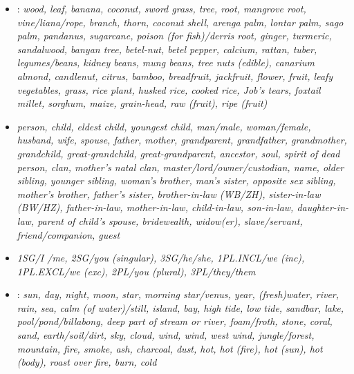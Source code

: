 \begin{itemize}
\item	{}: \it{wood},
\it{leaf},
\it{banana},
\it{coconut},
\it{sword grass},
\it{tree},
\it{root},
mangrove root,
\it{vine/liana/rope},
branch,
\it{thorn},
\it{coconut shell},
\it{arenga palm},
lontar palm,
\it{sago palm},
\it{pandanus},
\it{sugarcane},
poison (for fish)/derris root,
\it{ginger},
turmeric,
sandalwood,
banyan tree,
\it{betel-nut},
\it{betel pepper},
\it{calcium},
\it{rattan},
\it{tuber},
legumes/beans,
kidney beans,
mung beans,
tree nuts (edible),
canarium almond,
candlenut,
citrus,
\it{bamboo},
breadfruit,
jackfruit,
\it{flower},
\it{fruit},
leafy vegetables,
grass,
\it{rice plant},
\it{husked rice},
\it{cooked rice},
\it{Job’s tears},
\it{foxtail millet},
sorghum,
\it{maize},
\it{grain-head},
raw (fruit),
ripe (fruit)

\item	{}

\it{person},
\it{child},
\it{eldest child},
\it{youngest child},
\it{man/male},
\it{woman/female},
\it{husband},
\it{wife},
spouse,
\it{father},
\it{mother},
grandparent,
\it{grandfather},
\it{grandmother},
\it{grandchild},
great-grandchild,
great-grandparent,
ancestor,
\it{soul},
\it{spirit of dead person},
clan,
mother’s natal clan,
master/lord/owner/custodian,
\it{name},
\it{older sibling},
\it{younger sibling},
\it{woman’s brother},
\it{man’s sister},
opposite sex sibling,
\it{mother’s brother},
\it{father’s sister},
\it{brother-in-law (WB/ZH)},
\it{sister-in-law (BW/HZ)},
father-in-law,
mother-in-law,
child-in-law,
son-in-law,
daughter-in-law,
\it{parent of child’s spouse},
bridewealth,
widow(er),
\it{slave/servant},
\it{friend/companion},
\it{guest}

\item	{} 
\it{1SG/I /me},
\it{2SG/you (singular)},
\it{3SG/he/she},
\it{1PL.INCL/we (inc)},
\it{1PL.EXCL/we (exc)},
\it{2PL/you (plural)},
\it{3PL/they/them}
	
\item	{}:
\it{sun},
\it{day},
\it{night},
\it{moon},
\it{star},
morning star/venus,
year,
\it{(fresh)water},
\it{river},
\it{rain},
\it{sea},
\it{calm (of water)/still},
island,
\it{bay},
high tide,
low tide,
sandbar,
\it{lake},
pool/pond/billabong,
deep part of stream or river,
\it{foam/froth},
\it{stone},
coral,
\it{sand},
\it{earth/soil/dirt},
\it{sky},
\it{cloud},
\it{wind},
\it{ wind},
\it{west wind},
\it{jungle/forest},
\it{mountain},
\it{fire},
\it{smoke},
\it{ash},
\it{charcoal},
dust,
\it{hot},
hot (fire),
hot (sun),
hot (body),
roast over fire,
\it{burn},
\it{cold}
				

\end{itemize}

